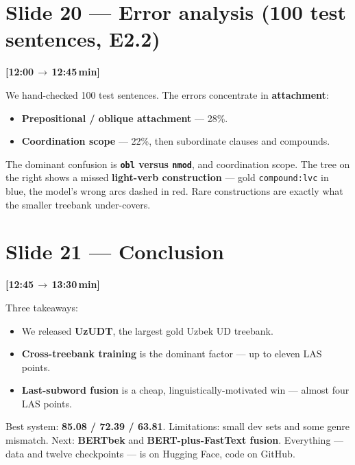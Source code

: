 \documentclass[12pt,a4paper]{article}
\newcommand{\timing}[2]{%
   \par\noindent\textbf{\small [#1\,$\to$\,#2\,min]}\par\vspace{0.2em}}
\newcommand{\say}[1]{\textbf{#1}}
\begin{document}
\section*{Slide 20 --- Error analysis (100 test sentences, E2.2)}
\timing{12:00}{12:45}

We hand-checked 100 test sentences. The errors concentrate in
\say{attachment}:

\begin{itemize}
   \item \textbf{Prepositional / oblique attachment} --- 28\%.
   \item \textbf{Coordination scope} --- 22\%, then subordinate clauses and compounds.
\end{itemize}

\noindent
The dominant confusion is \textbf{\texttt{obl} versus \texttt{nmod}}, and
coordination scope. The tree on the right shows a missed \say{light-verb
construction} --- gold \texttt{compound:lvc} in blue, the model's wrong
arcs dashed in red. Rare constructions are exactly what the smaller
treebank under-covers.

\section*{Slide 21 --- Conclusion}
\timing{12:45}{13:30}

Three takeaways:

\begin{itemize}
   \item We released \textbf{UzUDT}, the largest gold Uzbek UD treebank.
   \item \textbf{Cross-treebank training} is the dominant factor --- up to eleven LAS points.
   \item \textbf{Last-subword fusion} is a cheap, linguistically-motivated win --- almost four LAS points.
\end{itemize}

\noindent
Best system: \say{85.08 / 72.39 / 63.81}. Limitations: small dev sets
and some genre mismatch. Next: \textbf{BERTbek} and
\textbf{BERT-plus-FastText fusion}. Everything --- data and twelve
checkpoints --- is on Hugging Face, code on GitHub.
\end{document}
